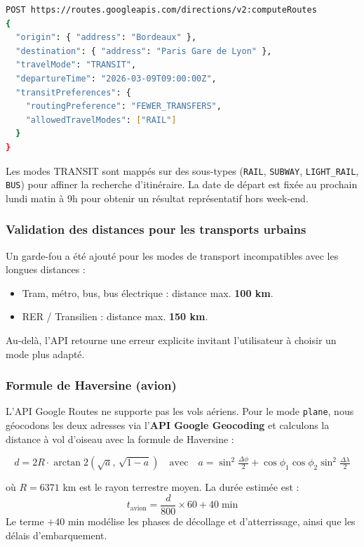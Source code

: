 \documentclass[11pt,a4paper]{article}
\begin{document}
\begin{lstlisting}[language=bash, caption={Exemple de requête Google Routes API}]
POST https://routes.googleapis.com/directions/v2:computeRoutes
{
  "origin": { "address": "Bordeaux" },
  "destination": { "address": "Paris Gare de Lyon" },
  "travelMode": "TRANSIT",
  "departureTime": "2026-03-09T09:00:00Z",
  "transitPreferences": {
    "routingPreference": "FEWER_TRANSFERS",
    "allowedTravelModes": ["RAIL"]
  }
}
\end{lstlisting}

Les modes TRANSIT sont mappés sur des sous-types (\texttt{RAIL}, \texttt{SUBWAY}, \texttt{LIGHT\_RAIL}, \texttt{BUS}) pour affiner la recherche d'itinéraire. La date de départ est fixée au prochain lundi matin à 9h pour obtenir un résultat représentatif hors week-end.

\subsubsection*{Validation des distances pour les transports urbains}

Un garde-fou a été ajouté pour les modes de transport incompatibles avec les longues distances :
\begin{itemize}
  \item Tram, métro, bus, bus électrique : distance max. \textbf{100 km}.
  \item RER / Transilien : distance max. \textbf{150 km}.
\end{itemize}
Au-delà, l'API retourne une erreur explicite invitant l'utilisateur à choisir un mode plus adapté.

\newpage
\subsubsection*{Formule de Haversine (avion)}

L'API Google Routes ne supporte pas les vols aériens. Pour le mode \texttt{plane}, nous géocodons les deux adresses via l'\textbf{API Google Geocoding} et calculons la distance à vol d'oiseau avec la formule de Haversine :

\begin{equation}
  d = 2R \cdot \arctan2\!\left(\sqrt{a},\, \sqrt{1-a}\right)
  \quad \text{avec} \quad
  a = \sin^2\!\tfrac{\Delta\phi}{2} + \cos\phi_1\cos\phi_2\sin^2\!\tfrac{\Delta\lambda}{2}
\end{equation}

où $R = 6371$ km est le rayon terrestre moyen. La durée estimée est :
\[
  t_{\text{avion}} = \frac{d}{800} \times 60 + 40 \;\text{min}
\]
Le terme $+40$ min modélise les phases de décollage et d'atterrissage, ainsi que les délais d'embarquement.
\end{document}
